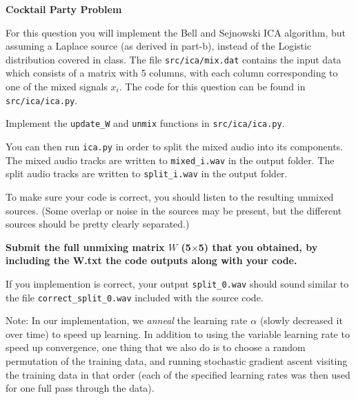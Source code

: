 \item {} \textbf{Cocktail Party Problem}

For this question you will implement the Bell and Sejnowski ICA algorithm, but
assuming a Laplace source (as derived in part-b), instead of the Logistic distribution
covered in class. The file \texttt{src/ica/mix.dat} contains the input data which consists of a matrix
with 5 columns, with each column corresponding to one of the mixed signals
$x_i$. The code for this question can be found in \texttt{src/ica/ica.py}.

Implement the \texttt{update\_W} and \texttt{unmix} functions in \texttt{src/ica/ica.py}.

You can then run \texttt{ica.py} in order to split the mixed audio into its components.
The mixed audio tracks are written to \texttt{mixed\_i.wav} in the output folder.
The split audio tracks are written to \texttt{split\_i.wav} in the output folder.

To make sure your code is correct, you should listen to the
resulting unmixed sources.  (Some overlap or noise in the sources may be present,
but the different sources should be pretty clearly separated.)

\textbf{Submit the full unmixing matrix $W$ (5$\times$5) that you obtained, by including the W.txt the code outputs along with your code.}

If you implemention is correct, your output \texttt{split\_0.wav} should sound similar to the file \texttt{correct\_split\_0.wav} included with the source code.

Note: In our implementation, we \textit{anneal} the learning rate $\alpha$
(slowly decreased it over time) to speed up learning. In addition to using the variable
learning rate to speed up convergence, one thing that we also do is to
choose a random permutation of the training data, and running stochastic
gradient ascent visiting the training data in that order (each of the
specified learning rates was then used for one full pass through the data).
